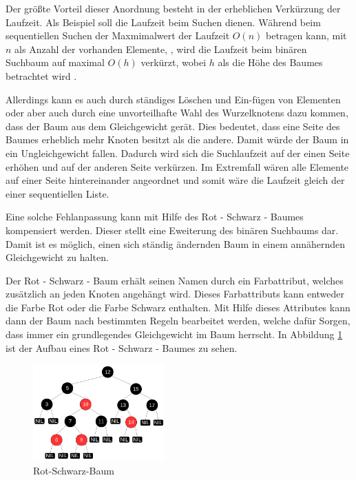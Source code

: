 Der größte Vorteil dieser Anordnung besteht in der erheblichen Verkürzung der Laufzeit. 
Als Beispiel soll die Laufzeit beim Suchen dienen.
Während beim sequentiellen Suchen der Maxmimalwert der Laufzeit $O(n)$ betragen kann, mit $n$ als Anzahl der vorhanden Elemente, , wird die Laufzeit beim binären Suchbaum auf maximal $O(h)$ verkürzt, wobei $h$ als die Höhe des Baumes betrachtet wird \cite{tcormen}.

Allerdings kann es auch durch ständiges Löschen und Ein-fügen von Elementen oder aber auch durch eine unvorteilhafte Wahl des Wurzelknotens dazu kommen, dass der Baum aus dem Gleichgewicht gerät. Dies bedeutet, dass eine Seite des Baumes erheblich mehr Knoten besitzt als die andere. Damit würde der Baum in ein Ungleichgewicht fallen. Dadurch wird sich die Suchlaufzeit auf der einen Seite erhöhen und auf der anderen Seite ver\-kürzen. Im Extremfall wären alle Elemente auf einer Seite hintereinander angeordnet und somit wäre die Laufzeit gleich der einer sequentiellen Liste.

Eine solche Fehlanpassung kann mit Hilfe des Rot - Schwarz - Baumes kompensiert werden. Dieser stellt eine Eweiterung des binären Suchbaums dar. Damit ist es möglich, einen sich ständig ändernden Baum in einem annähernden Gleichgewicht zu halten. 

Der Rot - Schwarz - Baum erhält seinen Namen durch ein Farbattribut, welches zusätzlich an jeden Knoten an\-gehängt wird. Dieses Farbattributs kann entweder die Farbe Rot oder die Farbe Schwarz enthalten. 
Mit Hilfe dieses Attributes kann dann der Baum nach bestimmten Regeln bearbeitet werden, welche dafür Sorgen, dass immer ein grundlegendes Gleichgewicht im Baum herrscht. 
In Abbildung \ref{fig:rbtree} ist der Aufbau eines Rot - Schwarz - Baumes zu sehen.

\begin{figure}[h]
	\centering
	\includegraphics[width=0.45\textwidth]{pictures/redblacktree.png}
	\caption{Rot-Schwarz-Baum}
	\label{fig:rbtree}
\end{figure}

